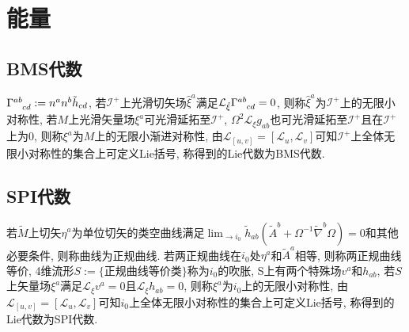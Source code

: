 \chapter{能量}

\section{BMS代数}

\def\Ip{\mathcal{I}^+}
\def\L{\mathcal{L}}
$\Gamma^{ab}_{\ph{ab}cd}:=n^an^b\tilde{h}_{cd}$, 若$\Ip$上光滑切矢场$\hat{\xi}^a$满足$\L_{\hat{\xi}}\Gamma^{ab}_{\ph{ab}cd}=0$, 则称$\hat{\xi}^a$为$\Ip$上的无限小对称性, 若$M$上光滑矢量场${\xi}^a$可光滑延拓至$\Ip$, $\Omega^2\L_{{\xi}}g_{ab}$也可光滑延拓至$\Ip$且在$\Ip$上为$0$, 则称${\xi}^a$为$M$上的无限小渐进对称性, 由$\L_{[u,v]}=[\L_u,\L_v]$可知$\Ip$上全体无限小对称性的集合上可定义Lie括号, 称得到的Lie代数为BMS代数.

\section{SPI代数}
若$\tilde{M}$上切矢$\eta^a$为单位切矢的类空曲线满足$\lim_{\to i_0}\tilde{h}_{ab}(\tilde{A}^b+\Omega^{-1}\tilde{\nabla}^b\Omega)=0$和其他必要条件, 则称曲线为正规曲线. 若两正规曲线在$i_0$处$\eta^a$和$\tilde{A}^a$相等, 则称两正规曲线等价, 4维流形$S:=\{\text{正规曲线等价类}\}$称为$i_0$的吹胀, S上有两个特殊场$v^a$和$h_{ab}$, 若$S$上矢量场${\xi}^a$满足$\L_{{\xi}}v^a=0$且$\L_{{\xi}}h_{ab}=0$, 则称${\xi}^a$为$i_0$上的无限小对称性, 由$\L_{[u,v]}=[\L_u,\L_v]$可知$i_0$上全体无限小对称性的集合上可定义Lie括号, 称得到的Lie代数为SPI代数.

